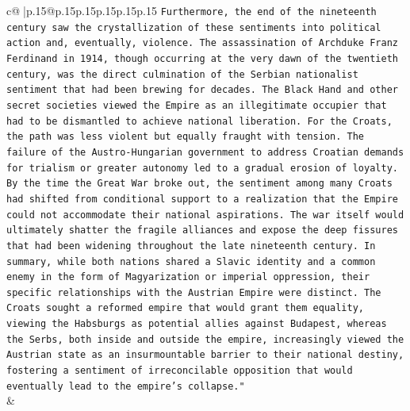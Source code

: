 \documentclass{article}
\begin{document}
{\begin{supertabular}{c@{$\;$}|p{.15\linewidth}@{}p{.15\linewidth}p{.15\linewidth}p{.15\linewidth}p{.15\linewidth}p{.15\linewidth}}
{{{\texttt{Furthermore, the end of the nineteenth century saw the crystallization of these sentiments into political action and, eventually, violence. The assassination of Archduke Franz Ferdinand in 1914, though occurring at the very dawn of the twentieth century, was the direct culmination of the Serbian nationalist sentiment that had been brewing for decades. The Black Hand and other secret societies viewed the Empire as an illegitimate occupier that had to be dismantled to achieve national liberation. For the Croats, the path was less violent but equally fraught with tension. The failure of the Austro{-}Hungarian government to address Croatian demands for trialism or greater autonomy led to a gradual erosion of loyalty. By the time the Great War broke out, the sentiment among many Croats had shifted from conditional support to a realization that the Empire could not accommodate their national aspirations. The war itself would ultimately shatter the fragile alliances and expose the deep fissures that had been widening throughout the late nineteenth century. In summary, while both nations shared a Slavic identity and a common enemy in the form of Magyarization or imperial oppression, their specific relationships with the Austrian Empire were distinct. The Croats sought a reformed empire that would grant them equality, viewing the Habsburgs as potential allies against Budapest, whereas the Serbs, both inside and outside the empire, increasingly viewed the Austrian state as an insurmountable barrier to their national destiny, fostering a sentiment of irreconcilable opposition that would eventually lead to the empire's collapse."} \\
            }
        }
    }
    & \\ \\


\end{supertabular}}
\end{document}
